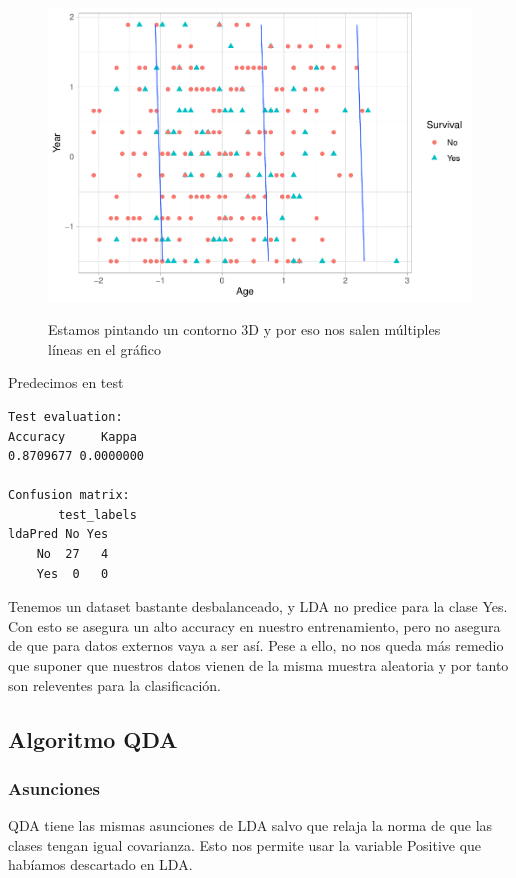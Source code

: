 \begin{figure}[H]\center\includegraphics[width=.9\linewidth]{img/Clasificacion_files/figure-latex/unnamed-chunk-26-1}\caption{}\small{Estamos pintando un contorno 3D y por eso nos salen múltiples líneas en el gráfico}\end{figure}

Predecimos en test

\begin{verbatim}
Test evaluation:
Accuracy     Kappa 
0.8709677 0.0000000 

Confusion matrix:
       test_labels
ldaPred No Yes
    No  27   4
    Yes  0   0
\end{verbatim}

Tenemos un dataset bastante desbalanceado, y LDA no predice para la clase Yes. Con esto se asegura un alto accuracy en nuestro entrenamiento, pero no asegura de que para datos externos vaya a ser así. Pese a ello, no nos queda más remedio que suponer que nuestros datos vienen de la misma muestra aleatoria y por tanto son releventes para la clasificación.

\subsection{Algoritmo QDA}
\subsubsection{Asunciones}

QDA tiene las mismas asunciones de LDA salvo que relaja la norma de que las clases tengan igual covarianza. Esto nos permite usar la variable Positive que habíamos descartado en LDA.

\vspace{\baselineskip}

